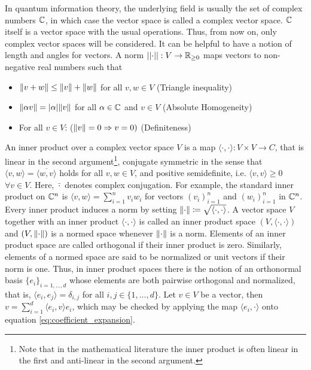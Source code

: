 In quantum information theory, the underlying field is usually the set of complex numbers $\mathbb{C}$, in which case the vector space is called a complex vector space. $\mathbb{C}$ itself is a vector space with the usual operations. Thus, from now on, only complex vector spaces will be considered. It can be helpful to have a notion of length and angles for vectors. A norm $\lvert \lvert \cdot \rvert \rvert : V \rightarrow \mathbb{R}_{\geq 0}$ maps vectors to non-negative real numbers such that 
\begin{itemize}
    \item$\lVert v+w\rVert \leq \lVert v\rVert + \lVert w\rVert $ for all $v,w \in V$ (Triangle inequality)
    \item$\lVert\alpha v\rVert=\lvert \alpha \rvert \lVert v\rVert$ for all $\alpha \in \mathbb{C}$ and $v \in V$ (Absolute Homogeneity)
    \item For all $v \in V$: ($\lVert v\rVert = 0 \Rightarrow v = 0)$ (Definiteness) 
\end{itemize}

An inner product over a complex vector space $V$ is a map $\langle \cdot, \cdot \rangle: V \times V \rightarrow C $, that is linear in the second argument\footnote{Note that in the mathematical literature the inner product is often linear in the first and anti-linear in the second argument.}, conjugate symmetric in the sense that $\langle v, w \rangle = \overline{\langle w, v \rangle}$ holds for all $v,w \in V$, and positive semidefinite, i.e. $\langle v, v \rangle \geq 0$ $\forall v \in V$. Here, $\bar \cdot$ denotes complex conjugation. For example, the standard inner product on $\mathbb{C}^n$ is $\langle v,w\rangle = \sum_{i=1}^n v_i w_i$ for vectors $(v_i)_{i=1}^n$ and $(w_i)_{i=1}^n$ in $\mathbb{C}^n$. Every inner product induces a norm by setting $\lVert\cdot\rVert \coloneqq \sqrt{\langle \cdot, \cdot \rangle}$. A vector space $V$ together with an inner product $\langle \cdot, \cdot \rangle$ is called an inner product space $(V, \langle \cdot, \cdot \rangle)$ and $(V, \lVert\cdot\rVert)$ is a normed space whenever $\lVert\cdot\rVert $ is a norm. Elements of an inner product space are called orthogonal if their inner product is zero. Similarly, elements of a normed space are said to be normalized or unit vectors if their norm is one. Thus, in inner product spaces there is the notion of an orthonormal basis $\{e_i\}_{i=1,\dots, d}$ whose elements are both pairwise orthogonal and normalized, that is, $\langle e_i, e_j\rangle = \delta_{i,j}$ for all $i,j \in \{1, \dots, d\}$. Let $v \in V$ be a vector, then $v = \sum_{i=1}^d \langle e_i , v \rangle e_i$, which may be checked by applying the map $\langle e_i, \cdot \rangle$ onto equation \eqref{eq:coefficient_expansion}.  

